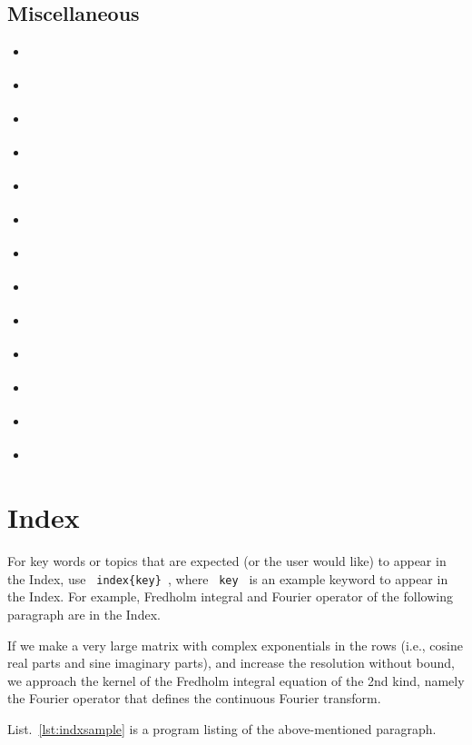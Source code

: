 \subsection{Miscellaneous}
\begin{itemize}
     \item \cite{almendro}
     \item \cite{baez/online}
     \item \cite{chiu}
     \item \cite{itzhaki}
     \item \cite{kowalik}
     \item \cite{laufenberg}
     \item \cite{loh}
     \item \cite{markey}
     \item \cite{misc-full}
     \item \cite{padhye}
     \item \cite{sorace}
     \item \cite{wassenberg}
     \item \cite{misc-minimal}
\end{itemize}



\cleardoublepage









\newpage
\section{Index}

For key words or topics that are expected (or the user would like) to appear in the Index, use \verb| index{key} |, where  \verb| key | is an example keyword to appear in the Index. For example, Fredholm integral and Fourier operator of the following paragraph are in the Index. 

If we make a very large matrix with complex exponentials in the rows (i.e., cosine real parts and sine imaginary parts), and increase the resolution without bound, we approach the kernel of the  Fredholm integral equation of the 2nd kind, namely the  Fourier operator that defines the continuous Fourier transform. 

List.~\ref{lst:indxsample} is a program listing of the above-mentioned paragraph.


